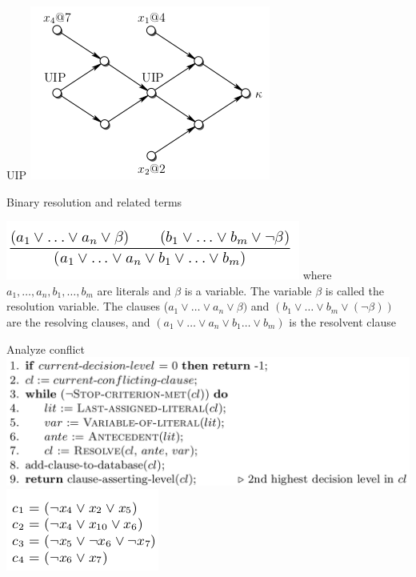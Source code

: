 \documentclass{beamer}
\begin{document}
\begin{frame}{UIP}
\includegraphics[scale=0.4]{UIP.png}
\begin{block}{Binary resolution and related terms}
\end{block}
\includegraphics[scale=0.5]{Binary_resolution.png}
where $a_1, \dots, a_n, b_1, \dots, b_m$ are literals and $\beta$ is a variable. The variable $\beta$ is called the resolution variable. The clauses ($a_1 \vee \dots \vee a_n \vee \beta)$ and $(b_1 \vee \dots \vee b_m \vee (\lnot\beta))$ are the resolving clauses, and $(a_1 \vee \dots \vee a_n \vee b_1 \dots \vee b_m)$ is the resolvent clause
\end{frame}

\begin{frame}{Analyze conflict}
\includegraphics[scale=0.25]{Analyze-Conflict.png}
\includegraphics[scale=0.5]{UIP1.png}
\end{frame}
\end{document}
